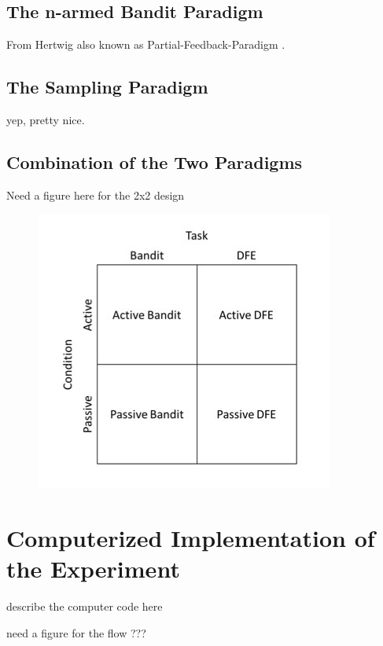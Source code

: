 \documentclass[
	12pt,
	oneside,
	bibliography=totocnumbered]{scrartcl}
\begin{document}
\subsection{The n-armed Bandit Paradigm}
From Hertwig also known as Partial-Feedback-Paradigm \cite{hertwig2009}.






\subsection{The Sampling Paradigm}
yep, pretty nice.





\subsection{Combination of the Two Paradigms}

Need a figure here for the 2x2 design

\begin{figure}[h]
\begin{center}
\includegraphics[scale=.5]{2x2_dummy}
\end{center}
\end{figure}





\section{Computerized Implementation of the Experiment}
describe the computer code here

need a figure for the flow ???


\printbibliography
\end{document}
